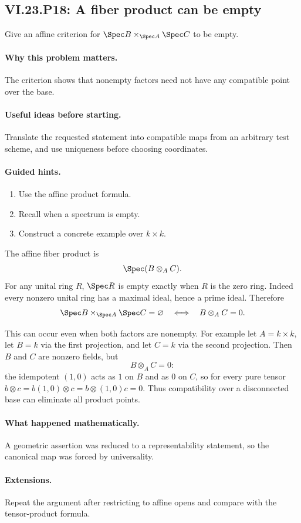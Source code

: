 \subsection*{VI.23.P18: A fiber product can be empty}
\begin{problem}\label{prob:vi23-p18}
Give an affine criterion for $\Spec B\times_{\Spec A}\Spec C$ to be empty.
\end{problem}

\ifdefined\FullProblemDossiers
\paragraph{Why this problem matters.}
The criterion shows that nonempty factors need not have any compatible point over the base.

\paragraph{Useful ideas before starting.}
Translate the requested statement into compatible maps from an arbitrary test scheme, and use uniqueness before choosing coordinates.

\paragraph{Guided hints.}
\begin{enumerate}
\item Use the affine product formula.
\item Recall when a spectrum is empty.
\item Construct a concrete example over $k\times k$.
\end{enumerate}

\begin{solution}
The affine fiber product is
\[
\Spec(B\otimes_AC).
\]
For any unital ring $R$, $\Spec R$ is empty exactly when $R$ is the zero ring.  Indeed every
nonzero unital ring has a maximal ideal, hence a prime ideal.  Therefore
\[
\Spec B\times_{\Spec A}\Spec C=\varnothing
\quad\Longleftrightarrow\quad
B\otimes_AC=0.
\]

This can occur even when both factors are nonempty.  For example let
$A=k\times k$, let $B=k$ via the first projection, and let $C=k$ via the second projection.
Then $B$ and $C$ are nonzero fields, but
\[
B\otimes_A C=0:
\]
the idempotent $(1,0)$ acts as $1$ on $B$ and as $0$ on $C$, so for every pure tensor
$b\otimes c=b(1,0)\otimes c=b\otimes (1,0)c=0$.  Thus compatibility over a disconnected base can
eliminate all product points.
\end{solution}

\paragraph{What happened mathematically.}
A geometric assertion was reduced to a representability statement, so the canonical map was forced by universality.

\paragraph{Extensions.}
Repeat the argument after restricting to affine opens and compare with the tensor-product formula.
\fi
